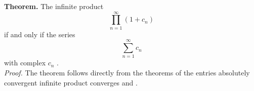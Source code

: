 \documentclass[12pt]{article}
\theoremstyle{definition}
\begin{document}
\textbf{Theorem.}\; The infinite product 
$$\prod_{n=1}^\infty(1\!+\!c_n)$$
 if and only if the series
$$\sum_{n=1}^\infty c_n$$
with complex  $c_n$ .\\

{\em Proof.}\; The theorem follows directly from the theorems of the entries absolutely convergent infinite product converges and .

\end{document}
